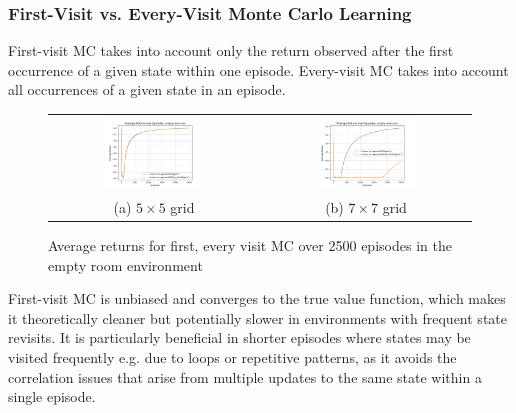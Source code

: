 \documentclass[12pt]{article}
\begin{document}
\subsubsection{First-Visit vs. Every-Visit Monte Carlo Learning}

First-visit MC takes into account only the return observed after the first occurrence of a given state within one episode.
Every-visit MC takes into account all occurrences of a given state in an episode.

\begin{figure}[!h]
	\centering
	\begin{tabular}{cc}
		\includegraphics[width=0.48\textwidth]{figures/mc-every-visit-empty-room-5x5.png} &
		\includegraphics[width=0.48\textwidth]{figures/mc-every-visit-empty-room-7x7.png}                         \\
		(a) $5 \times 5$ grid                                                             & (b) $7 \times 7$ grid
	\end{tabular}
	\caption{Average returns for first, every visit MC over 2500 episodes in the empty room environment}
	\label{fig:mc-every-visit-empty-room}
\end{figure}

First-visit MC is unbiased and converges to the true value function, which makes it theoretically cleaner but potentially slower in environments with frequent state revisits.
It is particularly beneficial in shorter episodes where states may be visited frequently e.g. due to loops or repetitive patterns, as it avoids the correlation issues that arise from multiple updates to the same state within a single episode.
\end{document}
